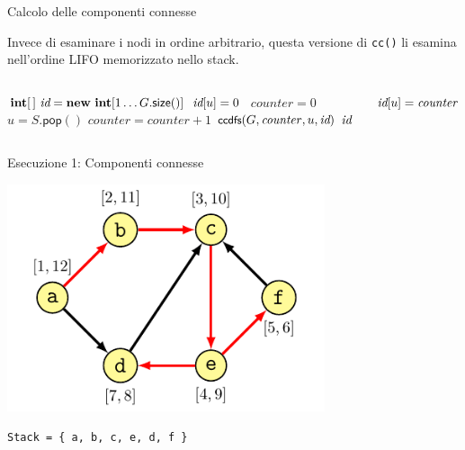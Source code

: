 \begin{frame}[fragile]{Calcolo delle componenti connesse}
 
Invece di esaminare i nodi in ordine arbitrario, questa versione di
\texttt{cc()} li esamina nell'ordine LIFO memorizzato nello stack.

\vspace{-12pt}
\begin{columns}[T]
\begin{Procedure}
\caption[A]{\connectedcomponents(\Graph $G$, \alert{$\Stack\ S$})}
$\INTEGER[\,]\ \components = \NEW\ \INTEGER[1 \mldots G.\textsf{size}()]$\;
{
  $\textit{id}[u] = 0$
}
\INTEGER\ $\mathit{counter} = 0$\;
{
  \alert{$u = S.\textsf{pop}()$}\;
  {
    $\mathit{counter} = \mathit{counter}+1$\;
    $\textsf{{\small ccdfs}}(G, \mathit{counter}, u, \textit{id})$\;
  }
}
\Return $\textit{id}$\;
\end{Procedure}
\begin{Procedure}
\caption[A]{\ccdfs(\Graph $G$, \INTEGER\ $\mathit{counter}$, \Node\ $u$, $\INTEGER[\,]\ \components$)}
$\textit{id}[u] = \mathit{counter}$\;
{
}
\end{Procedure}
\end{columns}
\end{frame}

\begin{frame}{Esecuzione 1: Componenti connesse}
    

\begin{overprint}
\centering\includegraphics[width=0.7\textwidth,page=4]{scc3.pdf}
\end{overprint}
\Large
\texttt{Stack = \{ a, b, c, e, d, f \} }

\end{frame}



